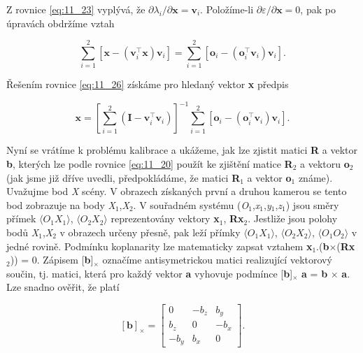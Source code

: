 Z rovnice \eqref{eq:11_23} vyplývá, že $\partial \lambda_{i}/\partial \mathbf{x} = \mathbf{v}_{i}$. Položíme-li $\partial \varepsilon/\partial \mathbf{x} = 0$, pak po úpravách obdržíme vztah

\begin{equation} \label{eq:11_26}
    \sum_{i=1}^{2} \left[ \mathbf{x} - \left( \mathbf{v}_{i}^\top \mathbf{x} \right) \mathbf{v}_{i} \right] = \sum_{i=1}^{2} \left[ \mathbf{o}_{i} - \left(\mathbf{o}_{i}^\top \mathbf{v}_{i} \right) \mathbf{v}_{i} \right] .
\end{equation}

Řešením rovnice \eqref{eq:11_26} získáme pro hledaný vektor \textbf{x} předpis

\begin{equation} \label{eq:11_27}
    \mathbf{x} = \left[ \sum_{i=1}^{2} \left( \mathbf{I} - \mathbf{v}_{i}^\top \mathbf{v}_{i} \right) \right]^{-1} \sum_{i=1}^{2} \left[ \mathbf{o}_{i} - \left( \mathbf{o}_{i}^\top \mathbf{v}_{i} \right) \mathbf{v}_{i} \right] .
\end{equation}

Nyní se vrátíme k problému kalibrace a ukážeme, jak lze zjistit matici \textbf{R} a vektor \textbf{b}, kterých lze podle rovnice \eqref{eq:11_20} použít ke zjištění matice \textbf{R}$_2$ a vektoru \textbf{o}$_2$ (jak jsme již dříve uvedli, předpokládáme, že matici \textbf{R}$_1$ a vektor \textbf{o}$_1$ známe). Uvažujme bod \textit{X} scény. V obrazech získaných první a druhou kamerou se tento bod zobrazuje na body \textit{X}$_1$,\textit{X}$_2$. V souřadném systému (\textit{O}$_1$,\textit{x}$_1$,\textit{y}$_1$,\textit{z}$_1$) jsou směry přímek $\langle O_1 X_1\rangle$, $\langle O_2 X_2\rangle$ reprezentovány vektory \textbf{x}$_1$, \textbf{Rx}$_2$. Jestliže jsou polohy bodů \textit{X}$_1$,\textit{X}$_2$ v obrazech určeny přesně, pak leží přímky $\langle O_1 X_1 \rangle$, $\langle O_2 X_2 \rangle$, $\langle O_1 O_2 \rangle$ v jedné rovině. Podmínku koplanarity lze matematicky zapsat vztahem \textbf{x}$_1.$(\textbf{b}$\times$(\textbf{Rx}$_2$)) = 0. Zápisem [\textbf{b}]$_\times$ označíme antisymetrickou matici realizující vektorový součin, tj. matici, která pro každý vektor \textbf{a} vyhovuje podmínce [\textbf{b}]$_\times$ \textbf{a} = \textbf{b} $\times$ \textbf{a}. Lze snadno ověřit, že platí

\begin{equation} \label{eq:11_28}
    \left[ \mathbf{b} \right]_{\times} = \left[
    \begin{array}{ccc}
    {0} & {-b_{z}} & {b_{y}} \\
    {b_{z}} & {0} & {-b_{x}} \\
    {-b_{y} } & {b_{x}} & {0}
    \end{array}
    \right].
\end{equation}

